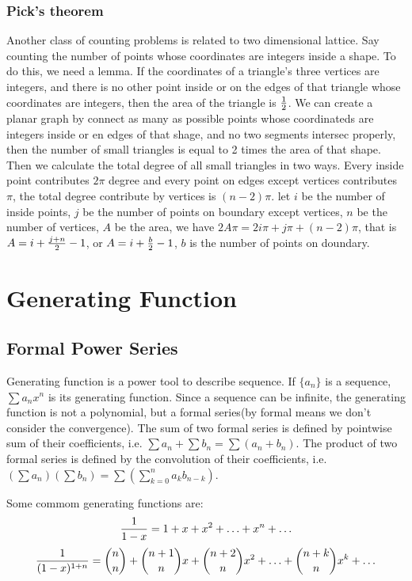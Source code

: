 \subsubsection{Pick's theorem}
Another class of counting problems is related to two dimensional lattice.
Say counting the number of points whose coordinates are integers inside a shape.
To do this, we need a lemma. If the coordinates of a triangle's three vertices are integers,
and there is no other point inside or on the edges of that triangle whose coordinates are integers,
then the area of the triangle is ${1\over 2}$. We can create a planar graph by connect as many as possible
points whose coordinateds are integers inside or en edges of that shage,
and no two segments intersec properly, then the number of small triangles is equal to 2 times the area of that shape.
Then we calculate the total degree of all small triangles in two ways.
Every inside point contributes $2\pi$ degree and every point on edges except vertices contributes $\pi$,
the total degree contribute by vertices is $(n-2)\pi$.
let $i$ be the number of inside points,
$j$ be the number of points on boundary except vertices,
$n$ be the number of vertices,
$A$ be the area, we have $2A\pi = 2i\pi + j\pi + (n-2)\pi$,
that is $A=i+{j+n\over 2}-1$, or $A=i+{b\over 2}-1$,
$b$ is the number of points on doundary.

\section{Generating Function}
\subsection{Formal Power Series}
Generating function is a power tool to describe sequence. If $\{a_n\}$ is a sequence,
$\sum a_n x^n$ is its generating function. Since a sequence can be infinite, the generating
function is not a polynomial, but a formal series(by formal means we don't consider the convergence).
The sum of two formal series is defined by pointwise sum of their coefficients,
i.e. $\sum a_n + \sum b_n = \sum (a_n+b_n)$.
The product of two formal series is defined by the convolution of their coefficients,
i.e. $(\sum a_n)(\sum b_n) = \sum (\sum_{k=0}^{n} a_k b_{n-k})$.

Some commom generating functions are:
$${1\over{1-x}} = 1 + x + x^2 + \ldots + x^n + \ldots$$
$${1\over{(1-x)^{1+n}}} = {n\choose n} + {n+1\choose n}x + {n+2\choose n}x^2 + \ldots + {n + k\choose n}x^k + \ldots$$

